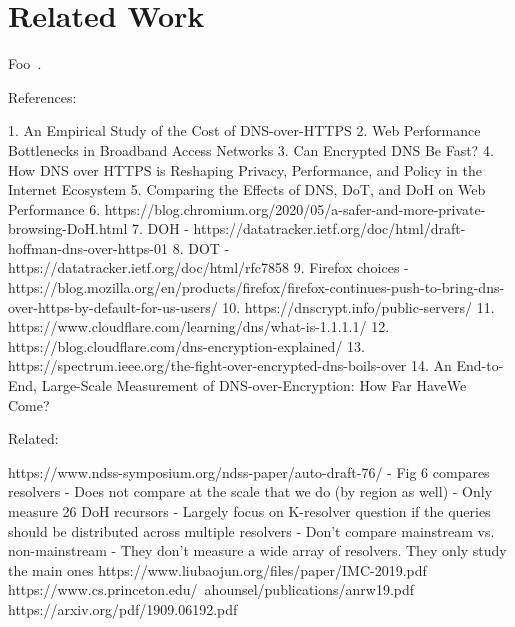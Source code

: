 \section{Related Work}\label{sec:related}

Foo~\cite{reich2013modular}.

References:

1.	An Empirical Study of the Cost of DNS-over-HTTPS
2.	Web Performance Bottlenecks in Broadband Access Networks
3.	Can Encrypted DNS Be Fast?
4.	How DNS over HTTPS is Reshaping Privacy, Performance, and Policy in the Internet Ecosystem
5.	Comparing the Effects of DNS, DoT, and DoH on Web Performance
6.	https://blog.chromium.org/2020/05/a-safer-and-more-private-browsing-DoH.html
7.	DOH - https://datatracker.ietf.org/doc/html/draft-hoffman-dns-over-https-01
8.	DOT - https://datatracker.ietf.org/doc/html/rfc7858 
9.	Firefox choices - https://blog.mozilla.org/en/products/firefox/firefox-continues-push-to-bring-dns-over-https-by-default-for-us-users/ 
10.	https://dnscrypt.info/public-servers/
11.	https://www.cloudflare.com/learning/dns/what-is-1.1.1.1/
12.	https://blog.cloudflare.com/dns-encryption-explained/
13.	https://spectrum.ieee.org/the-fight-over-encrypted-dns-boils-over
14.	An End-to-End, Large-Scale Measurement of DNS-over-Encryption: How Far HaveWe Come?



Related:

https://www.ndss-symposium.org/ndss-paper/auto-draft-76/
	- Fig 6 compares resolvers
	- Does not compare at the scale that we do (by region as well)
	- Only measure 26 DoH recursors
	- Largely focus on K-resolver question if the queries should be distributed across multiple resolvers
	- Don't compare mainstream vs. non-mainstream
	- They don't measure a wide array of resolvers. They only study the main ones 
https://www.liubaojun.org/files/paper/IMC-2019.pdf
https://www.cs.princeton.edu/~ahounsel/publications/anrw19.pdf
https://arxiv.org/pdf/1909.06192.pdf
